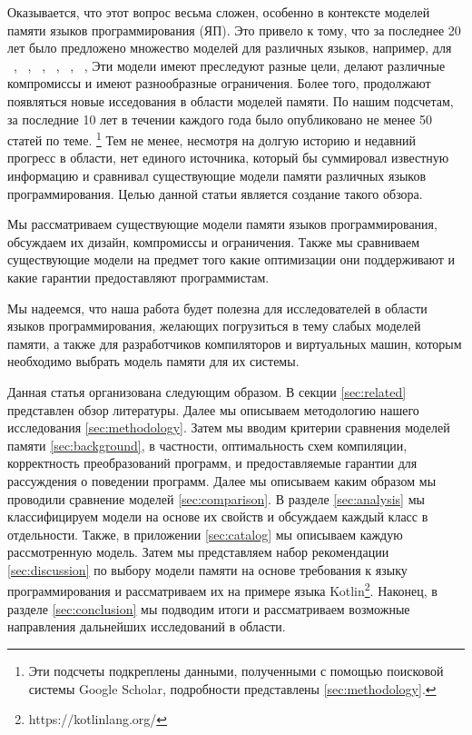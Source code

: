 Оказывается, что этот вопрос весьма сложен, 
особенно в контексте моделей памяти языков программирования (ЯП).
Это привело к тому, что за последнее 20 лет было предложено 
множество моделей для различных языков, например, для 
\Java~\cite{Manson-al:POPL05, Bender-Palsberg:OOPSLA19}, \CPP~\cite{Batty-al:POPL11}, 
\LLVM~\cite{Chakraborty-Vafeiadis:CGO17}, \JS~\cite{Watt-al:PLDI2020}, 
\OCaml~\cite{Manson-al:POPL05}, \Haskell~\cite{Vollmer-al:PPoPP17}, \etc
Эти модели имеют преследуют разные цели, делают различные компромиссы
и имеют разнообразные ограничения.
Более того, продолжают появляться новые исседования в области моделей памяти. 
По нашим подсчетам, за последние 10 лет в течении 
каждого года было опубликовано не менее 50 статей по теме.
\footnote{Эти подсчеты подкреплены данными, полученными 
с помощью поисковой системы Google Scholar, 
подробности представлены \cref{sec:methodology}.}
Тем не менее, несмотря на долгую историю и недавний прогресс в области,
нет единого источника, который бы суммировал 
известную информацию и сравнивал существующие 
модели памяти различных языков программирования. 
Целью данной статьи является создание такого обзора. 

Мы рассматриваем существующие модели памяти языков программирования, 
обсуждаем их дизайн, компромиссы и ограничения. 
Также мы сравниваем существующие модели на предмет того
какие оптимизации они поддерживают 
и какие гарантии предоставляют программистам. 

Мы надеемся, что наша работа будет полезна для 
исследователей в области языков программирования, 
желающих погрузиться в тему слабых моделей памяти, 
а также для разработчиков компиляторов и виртуальных машин, 
которым необходимо выбрать модель памяти для их системы.

Данная статья организована следующим образом. 
В секции \cref{sec:related} представлен обзор литературы. 
Далее мы описываем методологию нашего исследования \cref{sec:methodology}.
Затем мы вводим критерии сравнения моделей памяти \cref{sec:background}, 
в частности, оптимальность схем компиляции, 
корректность преобразований программ,
и предоставляемые гарантии для рассуждения 
о поведении программ.  
Далее мы описываем каким образом мы проводили 
сравнение моделей \cref{sec:comparison}. 
В разделе \cref{sec:analysis} мы классифицируем модели на основе их свойств
и обсуждаем каждый класс в отдельности. 
Также, в приложении \ref{sec:catalog} мы описываем каждую рассмотренную модель. 
Затем мы представляем набор рекомендации \cref{sec:discussion}
по выбору модели памяти на основе требования к языку программирования 
и рассматриваем их на примере языка Kotlin\footnote{https://kotlinlang.org/}.
Наконец, в разделе \cref{sec:conclusion} мы подводим итоги 
и рассматриваем возможные направления дальнейших исследований в области.
